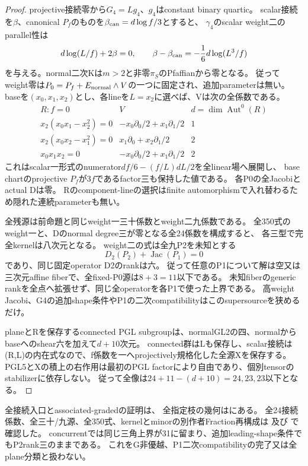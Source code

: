 \documentclass[a4paper,11pt]{ltjsarticle}
\theoremstyle{definition}
\begin{document}
\begin{proof}
projective接続零から$G_4=L g_4$、$g_4$はconstant binary quartic。
scalar接続を$\beta$、canonical $P_f$のものを$\beta_{\rm can}=d\log f/3$とすると、
$\gamma_4$のscalar weight二のparallel性は
\[
 d\log(L/f)+2\beta=0,\qquad
 \beta-\beta_{\rm can}=-\frac16d\log(L^3/f)
\]
を与える。normal二次Kは$m>2$と非零$\pi_S$のPfaffianから零となる。
従ってweight零は$P_0=P_f+E_{\rm normal}\wedge V$の一つに固定され、追加parameterは無い。
baseを$(x_0,x_1,x_2)$とし、各lineを$L=x_2$に選べば、Vは次の全係数である。
\[
 \begin{array}{c|c|c}
 R:f=0&V&d=\dim\operatorname{Aut}^0(R)\\ \hline
 x_2(x_0x_1-x_2^2)=0&-x_0\partial_0/2+x_1\partial_1/2&1\\
 x_2(x_0x_2-x_1^2)=0&x_1\partial_0+x_2\partial_1/2&2\\
 x_0x_1x_2=0&-x_0\partial_0/2+x_1\partial_1/2&2
 \end{array}
\]
これはscalar一形式のnumerator$df/6-(f/L)dL/2$を全linear場へ展開し、
base chartのprojective $P_f$が$3f$であるfactor三も保持した値である。
各P0の全Jacobiとactual Dは零。
Rのcomponent-lineの選択はfinite automorphismで入れ替わるため隠れた連続parameterも無い。

全残源は前命題と同じweight一三十係数とweight二九係数である。
全350式のweight一と、Dのnormal degree三が零となる全24係数を構成すると、
各三型で完全kernelは八次元となる。
weight二の式は全九P2を未知とする
\[
 D_2(P_2)+\operatorname{Jac}(P_1)=0
\]
であり、同じ固定operator D2のrankは六。
従って任意のP1について解は空又は三次元affine fiberで、全fixed-P0源は$8+3=11$以下である。
未知fiberのgeneric rankを全点へ拡張せず、同じ全operatorを各P1で使った上界である。
高weight Jacobi、G4の追加shape条件やP1の二次compatibilityはこのsupersourceを狭めるだけ。

planeとRを保存するconnected PGL subgroupは、normalGL2の四、normalからbaseへのshear六を加えて$d+10$次元。
connected群はLも保存し、scalar接続は(R,L)の内在式なので、f係数を一へprojectively規格化した全源Xを保存する。
PGL5とXの積上の右作用は最初のPGL factorにより自由であり、個別tensorのstabilizerに依存しない。
従って全像は$24+11-(d+10)=24,23,23$以下となる。
\end{proof}
全接続入口とassociated-gradedの証明は、
全指定枝の幾何はにある。
全24接続係数、全三十/九源、全350式、kernelとminorの別作者Fraction再構成は
及び
で確認した。
concurrentでは同じ三角上界が31に留まり、追加leading-shape条件でもP2rank三のままである。
これをG非優越、P1二次compatibilityの完了又は全plane分類と扱わない。
\end{document}
